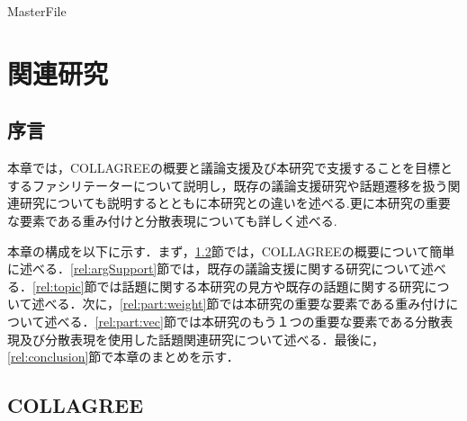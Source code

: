 \expandafter\ifx\csname MasterFile\endcsname\relax
	\def\SubFile{hoge}
	
	
	\setcounter{chapter}{1}
  \fi
  \cleardoublepage
\chapter{関連研究}
\label{relwork:chapter}

\section{序言}
\label{relwork:introduction}
本章では，COLLAGREEの概要と議論支援及び本研究で支援することを目標とするファシリテーターについて説明し，既存の議論支援研究や話題遷移を扱う関連研究についても説明するとともに本研究との違いを述べる.更に本研究の重要な要素である重み付けと分散表現についても詳しく述べる.

本章の構成を以下に示す．まず，\ref{rel:collagree}節では，COLLAGREEの概要について簡単に述べる．\ref{rel:argSupport}節では，既存の議論支援に関する研究について述べる．\ref{rel:topic}節では話題に関する本研究の見方や既存の話題に関する研究について述べる．次に，\ref{rel:part:weight}節では本研究の重要な要素である重み付けについて述べる．\ref{rel:part:vec}節では本研究のもう１つの重要な要素である分散表現及び分散表現を使用した話題関連研究について述べる．最後に，\ref{rel:conclusion}節で本章のまとめを示す．

\clearpage
\section{COLLAGREE}
\label{rel:collagree}
